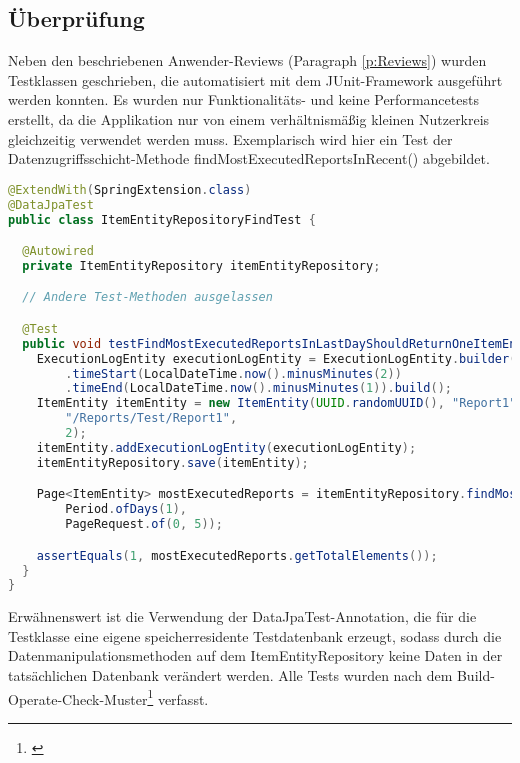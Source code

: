 \subsection{Überprüfung}
\label{sec:Ueberpruefung}
Neben den beschriebenen Anwender-Reviews (Paragraph \ref{p:Reviews}) wurden Testklassen geschrieben, die automatisiert mit dem JUnit-Framework ausgeführt werden konnten. Es wurden nur Funktionalitäts- und keine Performancetests erstellt, da die Applikation nur von einem verhältnismäßig kleinen Nutzerkreis gleichzeitig verwendet werden muss. Exemplarisch wird hier ein Test der Datenzugriffsschicht-Methode findMostExecutedReportsInRecent() abgebildet.
\begin{lstlisting}[language=Java,caption={ItemEntityRepositoryFindTest}]
@ExtendWith(SpringExtension.class)
@DataJpaTest
public class ItemEntityRepositoryFindTest {

  @Autowired
  private ItemEntityRepository itemEntityRepository;

  // Andere Test-Methoden ausgelassen

  @Test
  public void testFindMostExecutedReportsInLastDayShouldReturnOneItemEntity() {
    ExecutionLogEntity executionLogEntity = ExecutionLogEntity.builder()
        .timeStart(LocalDateTime.now().minusMinutes(2))
        .timeEnd(LocalDateTime.now().minusMinutes(1)).build();
    ItemEntity itemEntity = new ItemEntity(UUID.randomUUID(), "Report1",
        "/Reports/Test/Report1",
        2);
    itemEntity.addExecutionLogEntity(executionLogEntity);
    itemEntityRepository.save(itemEntity);

    Page<ItemEntity> mostExecutedReports = itemEntityRepository.findMostExecutedReportsInRecent(
        Period.ofDays(1),
        PageRequest.of(0, 5));

    assertEquals(1, mostExecutedReports.getTotalElements());
  }
}
\end{lstlisting}
Erwähnenswert ist die Verwendung der DataJpaTest-Annotation, die für die Testklasse eine eigene speicherresidente Testdatenbank erzeugt, sodass durch die Datenmanipulationsmethoden auf dem ItemEntityRepository keine Daten in der tatsächlichen Datenbank verändert werden. Alle Tests wurden nach dem Build-Operate-Check-Muster\footnote{\cite{fitnesse:boc}} verfasst.



